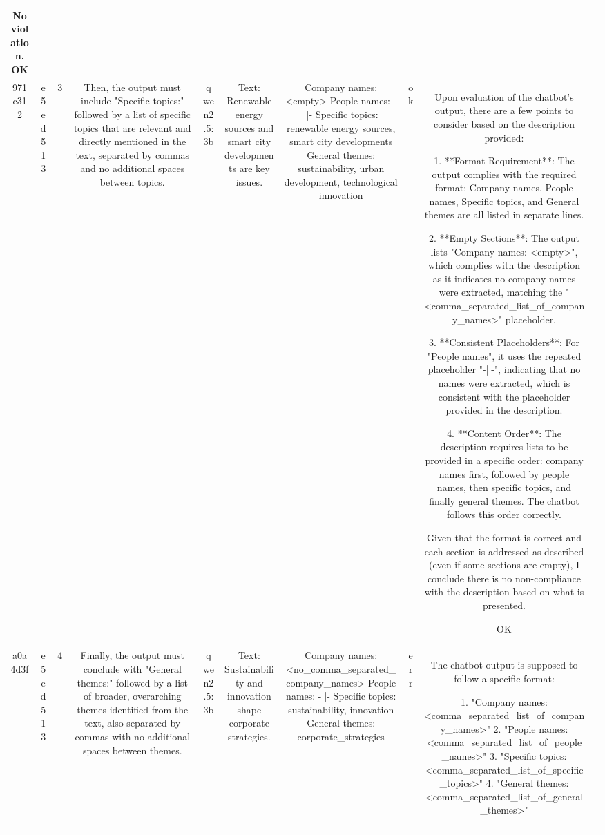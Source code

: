\begin{table}[h!]
\begin{tabular}{|c|c|c|c|c|c|c|c|c|c|}
No violation.
OK & \\
\hline
971c312 & e5ed513 & 3 & Then, the output must include "Specific topics:" followed by a list of specific topics that are relevant and directly mentioned in the text, separated by commas and no additional spaces between topics. & qwen2.5:3b & Text: Renewable energy sources and smart city developments are key issues. & Company names: <empty>
People names: -||-
Specific topics: renewable energy sources, smart city developments
General themes: sustainability, urban development, technological innovation & ok & Upon evaluation of the chatbot's output, there are a few points to consider based on the description provided:

1. **Format Requirement**: The output complies with the required format: Company names, People names, Specific topics, and General themes are all listed in separate lines.

2. **Empty Sections**: The output lists "Company names: <empty>", which complies with the description as it indicates no company names were extracted, matching the "<comma_separated_list_of_company_names>" placeholder. 

3. **Consistent Placeholders**: For "People names", it uses the repeated placeholder "-||-", indicating that no names were extracted, which is consistent with the placeholder provided in the description.

4. **Content Order**: The description requires lists to be provided in a specific order: company names first, followed by people names, then specific topics, and finally general themes. The chatbot follows this order correctly.

Given that the format is correct and each section is addressed as described (even if some sections are empty), I conclude there is no non-compliance with the description based on what is presented.

OK & \\
\hline
a0a4d3f & e5ed513 & 4 & Finally, the output must conclude with "General themes:" followed by a list of broader, overarching themes identified from the text, also separated by commas with no additional spaces between themes. & qwen2.5:3b & Text: Sustainability and innovation shape corporate strategies. & Company names: <no_comma_separated_company_names>
People names: -||-
Specific topics: sustainability, innovation
General themes: corporate_strategies & err & The chatbot output is supposed to follow a specific format: 

1. "Company names: <comma_separated_list_of_company_names>"
2. "People names: <comma_separated_list_of_people_names>"
3. "Specific topics: <comma_separated_list_of_specific_topics>"
4. "General themes: <comma_separated_list_of_general_themes>"


\end{tabular}
\end{table}

